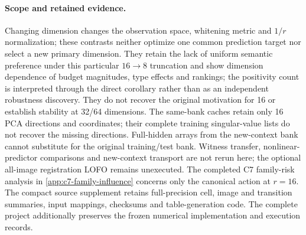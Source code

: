 \paragraph{Scope and retained evidence.}
Changing dimension changes the observation space, whitening metric and $1/r$ normalization; these contrasts neither optimize one common prediction target nor select a new primary dimension. They retain the lack of uniform semantic preference under this particular $16\!\to\!8$ truncation and show dimension dependence of budget magnitudes, type effects and rankings; the positivity count is interpreted through the direct corollary rather than as an independent robustness discovery. They do not recover the original motivation for 16 or establish stability at 32/64 dimensions. The same-bank caches retain only 16 PCA directions and coordinates; their complete training singular-value lists do not recover the missing directions. Full-hidden arrays from the new-context bank cannot substitute for the original training/test bank. Witness transfer, nonlinear-predictor comparisons and new-context transport are not rerun here; the optional all-image registration LOFO remains unexecuted. The completed C7 family-risk analysis in \cref{app:c7-family-influence} concerns only the canonical action at $r=16$. The compact source supplement retains full-precision cell, image and transition summaries, input mappings, checksums and table-generation code. The complete project additionally preserves the frozen numerical implementation and execution records.
